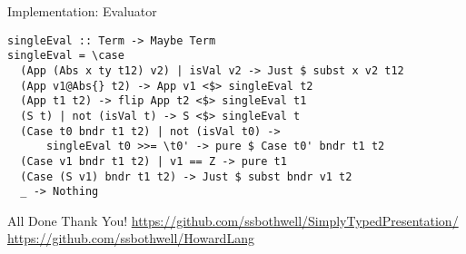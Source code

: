\documentclass[presentation]{beamer}
\begin{document}
\begin{frame}[label={sec:orgcdec295},fragile]{Implementation: Evaluator}
 \begin{verbatim}
singleEval :: Term -> Maybe Term
singleEval = \case
  (App (Abs x ty t12) v2) | isVal v2 -> Just $ subst x v2 t12
  (App v1@Abs{} t2) -> App v1 <$> singleEval t2
  (App t1 t2) -> flip App t2 <$> singleEval t1
  (S t) | not (isVal t) -> S <$> singleEval t
  (Case t0 bndr t1 t2) | not (isVal t0) -> 
      singleEval t0 >>= \t0' -> pure $ Case t0' bndr t1 t2
  (Case v1 bndr t1 t2) | v1 == Z -> pure t1
  (Case (S v1) bndr t1 t2) -> Just $ subst bndr v1 t2
  _ -> Nothing
\end{verbatim}
\end{frame}
\begin{frame}[label={sec:orged9616c}]{All Done}
\center
Thank You!
\url{https://github.com/ssbothwell/SimplyTypedPresentation/}
\url{https://github.com/ssbothwell/HowardLang}
\end{frame}
\end{document}

